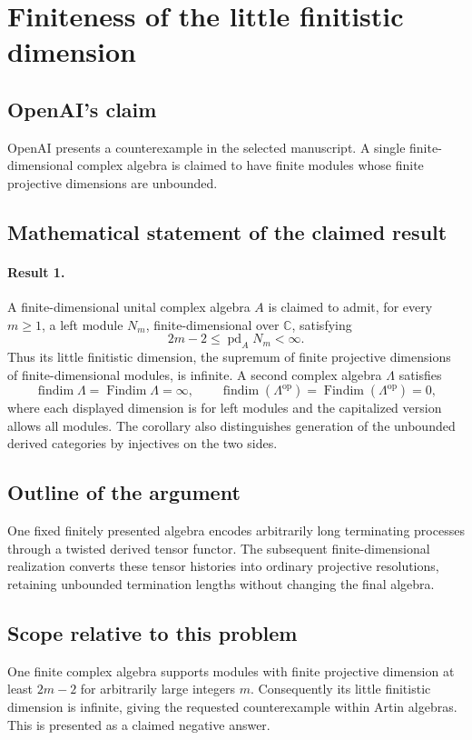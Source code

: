\documentclass[11pt]{article}
\begin{document}
\section*{Finiteness of the little finitistic dimension}

\subsection{OpenAI's claim}
OpenAI presents a counterexample in the selected manuscript. A single finite-dimensional complex algebra is claimed to have finite modules whose finite projective dimensions are unbounded.

\subsection{Mathematical statement of the claimed result}
\paragraph{Result 1.} A finite-dimensional unital complex algebra \(A\) is claimed to admit, for every \(m\ge1\), a left module \(N_m\), finite-dimensional over \(\mathbb C\), satisfying
\[
 2m-2\le\operatorname{pd}_AN_m<\infty.
\]
Thus its little finitistic dimension, the supremum of finite projective dimensions of finite-dimensional modules, is infinite. A second complex algebra \(\Lambda\) satisfies
\[
 \operatorname{findim}\Lambda=\operatorname{Findim}\Lambda=\infty,
 \qquad
 \operatorname{findim}(\Lambda^{\mathrm{op}})
 =\operatorname{Findim}(\Lambda^{\mathrm{op}})=0,
\]
where each displayed dimension is for left modules and the capitalized version allows all modules. The corollary also distinguishes generation of the unbounded derived categories by injectives on the two sides.

\subsection{Outline of the argument}
One fixed finitely presented algebra encodes arbitrarily long terminating processes through a twisted derived tensor functor. The subsequent finite-dimensional realization converts these tensor histories into ordinary projective resolutions, retaining unbounded termination lengths without changing the final algebra.

\subsection{Scope relative to this problem}
One finite complex algebra supports modules with finite projective dimension at least $2m-2$ for arbitrarily large integers $m$. Consequently its little finitistic dimension is infinite, giving the requested counterexample within Artin algebras. This is presented as a claimed negative answer.
\end{document}
